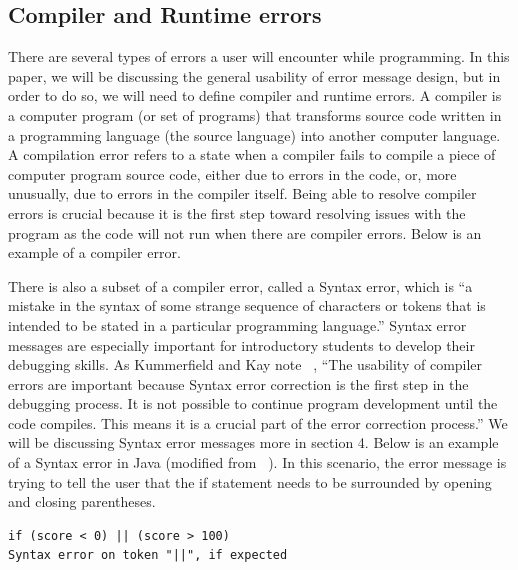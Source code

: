\documentclass{sig-alternate}
\begin{document}



\subsection{Compiler and Runtime errors}

There are several types of errors a user will encounter while programming.
In this paper, we will be discussing the general usability of error message design, but in order to do so, we will need to define compiler and runtime errors.
A compiler is a computer program (or set of programs) that transforms source code written in a programming language (the source language) into another computer language.
A compilation error refers to a state when a compiler fails to compile a piece of computer program source code, either due to errors in the code, or, more unusually, due to errors in the compiler itself.
Being able to resolve compiler errors is crucial because it is the first step toward resolving issues with the program as the code will not run when there are compiler errors.
Below is an example of a compiler error. 


There is also a subset of a compiler error, called a Syntax error, which is ``a mistake in the syntax of some strange sequence of characters or tokens that is intended to be stated in a particular programming language.''
Syntax error messages are especially important for introductory students to develop their debugging skills.
As Kummerfield and Kay note ~\cite{Kummerfeld:2003:NBF:858403.858416}, ``The usability of compiler errors are important because Syntax error correction is the first step in the debugging process.
It is not possible to continue program development until the code compiles.
This means it is a crucial part of the error correction process.''
We will be discussing Syntax error messages more in section 4.
Below is an example of a Syntax error in Java (modified from ~\cite{Denny:2014:ESE:2591708.2591748}).
In this scenario, the error message is trying to tell the user that the if statement needs to be surrounded by opening and closing parentheses.

\begin{verbatim}
if (score < 0) || (score > 100) 
Syntax error on token "||", if expected
\end{verbatim}
\end{document}
